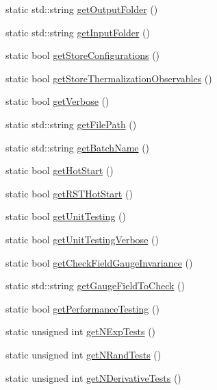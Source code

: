 \begin{DoxyCompactItemize}
static std\+::string \mbox{\hyperlink{class_parameters_afa4cfe5dc4302b1e8f8928606ea9b056}{get\+Output\+Folder}} ()
\item 
static std\+::string \mbox{\hyperlink{class_parameters_aa593520a8f1c3282e399feb0cf70217b}{get\+Input\+Folder}} ()
\item 
static bool \mbox{\hyperlink{class_parameters_a38f06b562355b56a1b1222e1cfe6735a}{get\+Store\+Configurations}} ()
\item 
static bool \mbox{\hyperlink{class_parameters_a216f85b3c5980a33f8a54c42fb3575c7}{get\+Store\+Thermalization\+Observables}} ()
\item 
static bool \mbox{\hyperlink{class_parameters_a07453f20719f54f9fd6f72d311638b39}{get\+Verbose}} ()
\item 
static std\+::string \mbox{\hyperlink{class_parameters_abace4edb8ece38841b58c5ce6168cbc4}{get\+File\+Path}} ()
\item 
static std\+::string \mbox{\hyperlink{class_parameters_a181a773d23fdb19d0c4f35e6cf2d5649}{get\+Batch\+Name}} ()
\item 
static bool \mbox{\hyperlink{class_parameters_a5ba21c056f0b7da17abcdd0a1eb2061f}{get\+Hot\+Start}} ()
\item 
static bool \mbox{\hyperlink{class_parameters_a4c24cb57765589a12eae030894423735}{get\+R\+S\+T\+Hot\+Start}} ()
\item 
static bool \mbox{\hyperlink{class_parameters_a785042104e5f47f11d625ec346853174}{get\+Unit\+Testing}} ()
\item 
static bool \mbox{\hyperlink{class_parameters_a2645617063e170828a3da439094ab626}{get\+Unit\+Testing\+Verbose}} ()
\item 
static bool \mbox{\hyperlink{class_parameters_a2563b9474acd87cf4a350f488c71339f}{get\+Check\+Field\+Gauge\+Invariance}} ()
\item 
static std\+::string \mbox{\hyperlink{class_parameters_ad6dea2bb6e91a1ca4fb5e20216b40039}{get\+Gauge\+Field\+To\+Check}} ()
\item 
static bool \mbox{\hyperlink{class_parameters_a778a2311c27854392c34c15bd4ea19f8}{get\+Performance\+Testing}} ()
\item 
static unsigned int \mbox{\hyperlink{class_parameters_abd70d1df3ee0109789496fc9d21c2aef}{get\+N\+Exp\+Tests}} ()
\item 
static unsigned int \mbox{\hyperlink{class_parameters_a492a81a7a0951b1165f500f8c0768fe1}{get\+N\+Rand\+Tests}} ()
\item 
static unsigned int \mbox{\hyperlink{class_parameters_a24545a7987ec3056a6c0ad742edd9ba5}{get\+N\+Derivative\+Tests}} ()

\end{DoxyCompactItemize}
